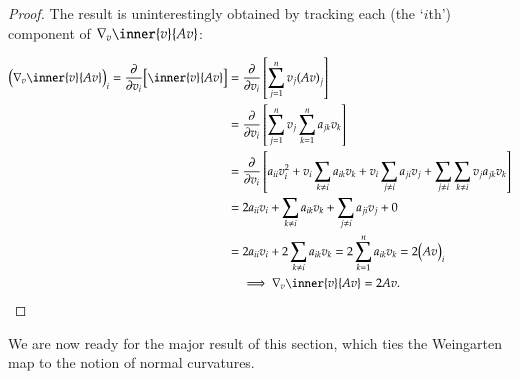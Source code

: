         \begin{proof}
            The result is uninterestingly obtained by tracking
            each (the `$i$th') component of
            $\nabla_{v} \inner{v}{Av}$:
            
            \begin{align}
            {\Big(\nabla_{v} \inner{v}{Av}\Big)}_{i} =
                    \frac{\partial}{\partial v_i} \Big[
                    \inner{v}{Av}\Big]
                    &=  \frac{\partial}{\partial v_i} \left[
                        \sum_{j=1}^{n} v_j {(Av)}_j\right] \\
                    &=	\frac{\partial}{\partial v_i} \left[
                    \sum_{j=1}^{n} v_j \sum_{k=1}^n a_{jk} v_k \right] \\
                    &= \frac{\partial}{\partial v_i} \left[
                    a_{ii} v_i^2 + v_i \sum_{k\ne i} a_{ik} v_k
				                 + v_i \sum_{j\ne i} a_{ji} v_j
				                 + \sum_{j\ne i} \sum_{k \ne i} v_j a_{jk} v_k \right] \\
				    &=  2 a_{ii} v_i + \sum_{k\ne i} a_{ik} v_k
				    + \sum_{j\ne i} a_{ji} v_j + 0 \\
				    &= 2 a_{ii} v_i + 2 \sum_{k\ne i} a_{ik} v_k
				     = 2 \sum_{k=1}^n a_{ik}v_{k} = 2 {\big(Av\big)}_i \\
				     &\quad \implies \nabla_{v} \inner{v}{Av} = 2Av.
            \end{align}
        \end{proof}
        
        We are now ready for the major result of this section, which ties the Weingarten map to the
        notion of normal curvatures.
        

